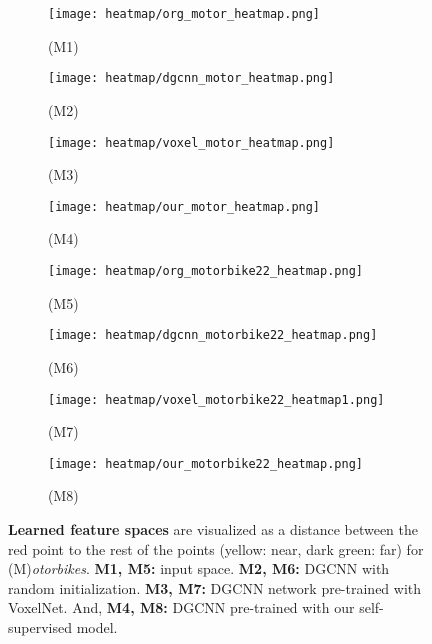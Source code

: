 \documentclass{article}
\begin{document}
\begin{figure}[h]
	\centering    
    	\begin{subfigure}{.45\textwidth}
		\centering
		\texttt{[image: heatmap/org\_motor\_heatmap.png]}
		\caption*{(M1)}
		\label{fig:heat17}
    \end{subfigure}\begin{subfigure}{.45\textwidth}
		\centering
		\texttt{[image: heatmap/dgcnn\_motor\_heatmap.png]}
		\caption*{(M2)}
		\label{fig:heat18}
    \end{subfigure}
    \begin{subfigure}{.45\textwidth}
		\centering
		\texttt{[image: heatmap/voxel\_motor\_heatmap.png]}
		\caption*{(M3)}
		\label{fig:heat19}
	\end{subfigure}\begin{subfigure}{.45\textwidth}
		\centering
		\texttt{[image: heatmap/our\_motor\_heatmap.png]}
		\caption*{(M4)}
		\label{fig:heat20}
    \end{subfigure}
	    	\begin{subfigure}{.45\textwidth}
		\centering
		\texttt{[image: heatmap/org\_motorbike22\_heatmap.png]}
		\caption*{(M5)}
		\label{fig:sub21}
    \end{subfigure}\begin{subfigure}{.45\textwidth}
		\centering
		\texttt{[image: heatmap/dgcnn\_motorbike22\_heatmap.png]}
		\caption*{(M6)}
		\label{fig:sub22}
    \end{subfigure}
    \begin{subfigure}{.45\textwidth}
		\centering
		\texttt{[image: heatmap/voxel\_motorbike22\_heatmap1.png]}
		\caption*{(M7)}
		\label{fig:sub23}
	\end{subfigure}\begin{subfigure}{.45\textwidth}
		\centering
		\texttt{[image: heatmap/our\_motorbike22\_heatmap.png]}
		\caption*{(M8)}
		\label{fig:sub24}
    \end{subfigure}
\caption{\textbf{Learned feature spaces} are visualized as a distance between the red point to the rest of the points (yellow: near, dark green: far) for (M)\emph{otorbikes}. \textbf{M1, M5:} input  space. \textbf{M2, M6:} DGCNN with random initialization. \textbf{M3, M7:} DGCNN network pre-trained with VoxelNet. And, \textbf{M4, M8:} DGCNN pre-trained with our self-supervised model.}
	\label{fig:heatmap_supp4}
\end{figure}
\end{document}
